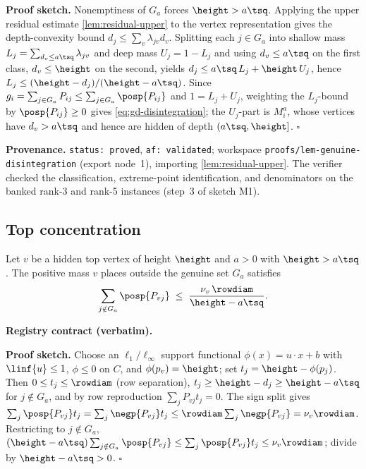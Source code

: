\noindent\textbf{Proof sketch.} Nonemptiness of $G_a$ forces $\height>a\tsq$. Applying the upper
residual estimate \ref{lem:residual-upper} to the vertex representation gives the depth-convexity bound
$d_j\le\sum_v\lambda_{jv}d_v$. Splitting each $j\in G_a$ into shallow mass
$L_j=\sum_{d_v\le a\tsq}\lambda_{jv}$ and deep mass $U_j=1-L_j$ and using $d_v\le a\tsq$ on the first
class, $d_v\le\height$ on the second, yields $d_j\le a\tsq\,L_j+\height\,U_j$, hence
$L_j\le(\height-d_j)/(\height-a\tsq)$. Since $g_i=\sum_{j\in G_a}P_{ij}\le\sum_{j\in G_a}\posp{P_{ij}}$
and $1=L_j+U_j$, weighting the $L_j$-bound by $\posp{P_{ij}}\ge0$ gives \eqref{eq:gd-disintegration};
the $U_j$-part is $M_i^a$, whose vertices have $d_v>a\tsq$ and hence are hidden of depth
$(a\tsq,\height]$. \hfill$\square$

\noindent\textbf{Provenance.} \texttt{status: proved}, \texttt{af: validated}; workspace
\texttt{proofs/lem-genuine-disintegration} (export node~1), importing \ref{lem:residual-upper}. The
verifier checked the classification, extreme-point identification, and denominators on the banked
rank-3 and rank-5 instances (step~3 of sketch M1).

\subsection{Top concentration}

\begin{lemma}\label{lem:top-concentration}
Let $v$ be a hidden top vertex of height $\height$ and $a>0$ with $\height>a\tsq$. The positive mass
$v$ places outside the genuine set $G_a$ satisfies
\begin{equation}\label{eq:gd-topconc}
  \sum_{j\notin G_a}\posp{P_{vj}}\;\le\;\frac{\nu_v\,\rowdiam}{\height-a\tsq}.
\end{equation}
\end{lemma}

\noindent\textbf{Registry contract (verbatim).}

\noindent\textbf{Proof sketch.} Choose an $\ell_1/\ell_\infty$ support functional $\phi(x)=u\cdot x+b$
with $\linf{u}\le1$, $\phi\le0$ on $C$, and $\phi(p_v)=\height$; set $t_j=\height-\phi(p_j)$. Then
$0\le t_j\le\rowdiam$ (row separation), $t_j\ge\height-d_j\ge\height-a\tsq$ for $j\notin G_a$, and by
row reproduction $\sum_j P_{vj}t_j=0$. The sign split gives
$\sum_j\posp{P_{vj}}t_j=\sum_j\negp{P_{vj}}t_j\le\rowdiam\sum_j\negp{P_{vj}}=\nu_v\rowdiam$. Restricting
to $j\notin G_a$, $(\height-a\tsq)\sum_{j\notin G_a}\posp{P_{vj}}\le\sum_j\posp{P_{vj}}t_j\le\nu_v\rowdiam$;
divide by $\height-a\tsq>0$. \hfill$\square$

